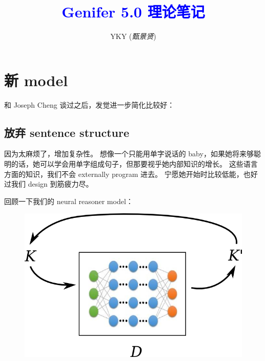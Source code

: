 \documentclass[12pt]{article}
\title{\textcolor{blue}{Genifer 5.0 理论笔记}}
\author{YKY (\textit{甄景贤})}
\newcommand{\tab}{\hspace*{1cm}}
\begin{document}

{\let\newpage\relax\maketitle}

\maketitle
\setlength{\parindent}{0em}
\setlength{\parskip}{1.5ex plus0.5ex minus1.2ex}

\section{新 model}

和 Joseph Cheng 谈过之后，发觉进一步简化比较好：

\subsection{放弃 sentence structure}

因为太麻烦了，增加复杂性。  想像一个只能用单字说话的 baby，如果她将来够聪明的话，她可以学会用单字组成句子，但那要视乎她内部知识的增长。 这些语言方面的知识，我们不会 externally program 进去。 宁愿她开始时比较低能，也好过我们 design 到筋疲力尽。

回顾一下我们的 neural reasoner model：
\begin{figure}[H]
\centering
\includegraphics[scale=0.75]{genifer-model-0.png}
\end{figure}
\end{document}
